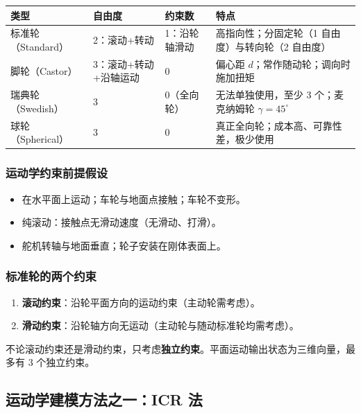 \documentclass[11pt,a4paper]{article}
\begin{document}
\begin{center}
\begin{tabular}{p{2.5cm}|p{2.8cm}|p{2cm}|p{4.5cm}}
\toprule
类型 & 自由度 & 约束数 & 特点 \\
\midrule
标准轮（Standard） & 2：滚动+转动 & 1：沿轮轴滑动 & 高指向性；分固定轮（1 自由度）与转向轮（2 自由度） \\
脚轮（Castor） & 3：滚动+转动+沿轴运动 & 0 & 偏心距 $d$；常作随动轮；调向时施加扭矩 \\
瑞典轮（Swedish） & 3 & 0（全向轮） & 无法单独使用，至少 3 个；麦克纳姆轮 $\gamma=45^\circ$ \\
球轮（Spherical） & 3 & 0 & 真正全向轮；成本高、可靠性差，极少使用 \\
\bottomrule
\end{tabular}
\end{center}

\subsubsection{运动学约束前提假设}
\begin{itemize}
  \item 在水平面上运动；车轮与地面点接触；车轮不变形。
  \item 纯滚动：接触点无滑动速度（无滑动、打滑）。
  \item 舵机转轴与地面垂直；轮子安装在刚体表面上。
\end{itemize}

\subsubsection{标准轮的两个约束}
\begin{enumerate}
  \item \textbf{滚动约束}：沿轮平面方向的运动约束（主动轮需考虑）。
  \item \textbf{滑动约束}：沿轮轴方向无运动（主动轮与随动标准轮均需考虑）。
\end{enumerate}
\begin{notebox}
不论滚动约束还是滑动约束，只考虑\textbf{独立约束}。平面运动输出状态为三维向量，最多有 3 个独立约束。
\end{notebox}

\subsection{运动学建模方法之一：ICR 法}
\end{document}
